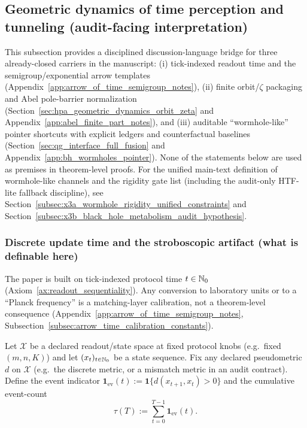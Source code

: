 \subsection*{Geometric dynamics of time perception and tunneling (audit-facing interpretation)}
\AuditTag This subsection provides a disciplined discussion-language bridge for three already-closed carriers in the manuscript:
(i) tick-indexed readout time and the semigroup/exponential arrow templates (Appendix~\ref{app:arrow_of_time_semigroup_notes}),
(ii) finite orbit/\texorpdfstring{$\zeta$}{zeta} packaging and Abel pole-barrier normalization (Section~\ref{sec:hpa_geometric_dynamics_orbit_zeta}
and Appendix~\ref{app:abel_finite_part_notes}),
and (iii) auditable ``wormhole-like'' pointer shortcuts with explicit ledgers and counterfactual baselines
(Section~\ref{sec:qg_interface_full_fusion} and Appendix~\ref{app:bh_wormholes_pointer}).
None of the statements below are used as premises in theorem-level proofs.
\AuditTag For the unified main-text definition of wormhole-like channels and the rigidity gate list (including the audit-only HTF-lite fallback discipline),
see Section~\ref{subsec:x3a_wormhole_rigidity_unified_constraints} and Section~\ref{subsec:x3b_black_hole_metabolism_audit_hypothesis}.

\subsubsection*{Discrete update time and the stroboscopic artifact (what is definable here)}
\AuditTag The paper is built on tick-indexed protocol time $t\in\mathbb{N}_0$ (Axiom~\ref{ax:readout_sequentiality}).
Any conversion to laboratory units or to a ``Planck frequency'' is a matching-layer calibration, not a theorem-level consequence
(Appendix~\ref{app:arrow_of_time_semigroup_notes}, Subsection~\ref{subsec:arrow_time_calibration_constants}).

\begin{definition}\label{def:tick_eventful_proper_time_proxy}
\MathTag Let $\mathcal{X}$ be a declared readout/state space at fixed protocol knobs (e.g.\ fixed $(m,n,K)$) and let $(x_t)_{t\in\mathbb{N}_0}$ be a state sequence.
Fix any declared pseudometric $d$ on $\mathcal{X}$ (e.g.\ the discrete metric, or a mismatch metric in an audit contract).
Define the event indicator $\mathbf{1}_{\mathrm{ev}}(t):=\mathbf{1}\{d(x_{t+1},x_t)>0\}$ and the cumulative event-count
\[
\tau(T):=\sum_{t=0}^{T-1}\mathbf{1}_{\mathrm{ev}}(t).
\]
\end{definition}

